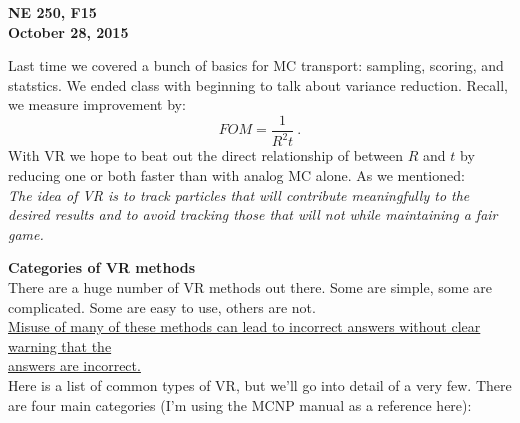 \documentclass[12pt]{article}
\begin{document}
\begin{center}
{\bf NE 250, F15\\
October 28, 2015 
}
\end{center}

Last time we covered a bunch of basics for MC transport: sampling, scoring, and statstics. We ended class with beginning to talk about variance reduction. Recall, we measure improvement by:
\[
FOM =\frac{1}{R^2 t}\:.
\]
With VR we hope to beat out the direct relationship of between $R$ and $t$ by reducing one or both faster than with analog MC alone. As we mentioned:\\
\textit{The idea of VR is to track particles that will contribute meaningfully to the desired results and to avoid tracking those that will not while maintaining a fair game.}

\textbf{Categories of VR methods}\\
There are a huge number of VR methods out there. Some are simple, some are complicated. Some are easy to use, others are not. \\
\underline{Misuse of many of these methods can lead to incorrect answers without clear warning that the} \\\underline{answers are incorrect.}\\
Here is a list of common types of VR, but we'll go into detail of a very few. There are four main categories (I'm using the MCNP manual as a reference here):
%
\end{document}
